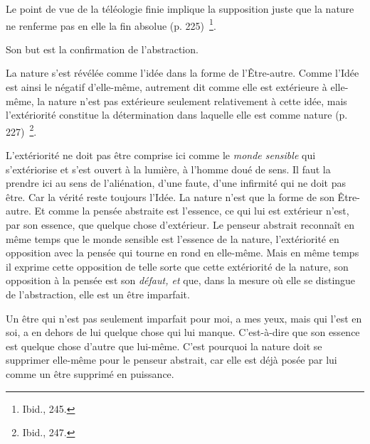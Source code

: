 \documentclass[french,twoside]{book} %
\newenvironment{quoteblock}%
  {\begin{quoting}}
  {\end{quoting}}
\newenvironment{quotebar}{%
    \def\FrameCommand{{\color{rubric!10!}\vrule width 0.5em} \hspace{0.9em}}%
    \def\OuterFrameSep{\itemsep} %
    \MakeFramed {\advance\hsize-\width \FrameRestore}
  }%
  {%
    \endMakeFramed
  }
\renewenvironment{quoteblock}%
  {%
    \savenotes
    \setstretch{0.9}
    \normalfont
    \begin{quotebar}
  }
  {%
    \end{quotebar}
    \spewnotes
  }
\begin{document}
\begin{quoteblock}
 \noindent Le point de vue de la téléologie finie implique la supposition juste que la nature ne renferme pas en elle la fin absolue (p. 225) \footnote{Ibid., 245.}.
 \end{quoteblock}

\noindent Son but est la confirmation de l’abstraction.\par

\begin{quoteblock}
 \noindent La nature s’est révélée comme l’idée dans la forme de l’Être-autre. Comme l’Idée est ainsi le négatif d’elle-même, autrement dit comme elle est extérieure à elle-même, la nature n’est pas extérieure seulement relativement à cette idée, mais l’extériorité constitue la détermination dans laquelle elle est comme nature (p. 227) \footnote{Ibid., 247.}.
 \end{quoteblock}

\noindent L’extériorité ne doit pas être comprise ici comme le \emph{monde sensible} qui s’extériorise et s’est ouvert à la lumière, à l’homme doué de sens. Il faut la prendre ici au sens de l’aliénation, d’une faute, d’une infirmité qui ne doit pas être. Car la vérité reste toujours l’Idée. La nature n’est que la forme de son Être-autre. Et comme la pensée abstraite est l’essence, ce qui lui est extérieur n’est, par son essence, que quelque chose d’extérieur. Le penseur abstrait reconnaît en même temps que le monde sensible est l’essence de la nature, l’extériorité en opposition avec la pensée qui tourne en rond en elle-même. Mais en même temps il exprime cette opposition de telle sorte que cette extériorité de la nature, son opposition à la pensée est son \emph{défaut, et} que, dans la mesure où elle se distingue de l’abstraction, elle est un être imparfait.\par
[XXXIV] Un être qui n’est pas seulement imparfait pour moi, a mes yeux, mais qui l’est en soi, a en dehors de lui quelque chose qui lui manque. C’est-à-dire que son essence est quelque chose d’autre que lui-même. C’est pourquoi la nature doit se supprimer elle-même pour le penseur abstrait, car elle est déjà posée par lui comme un être supprimé en puissance.\par
\end{document}
